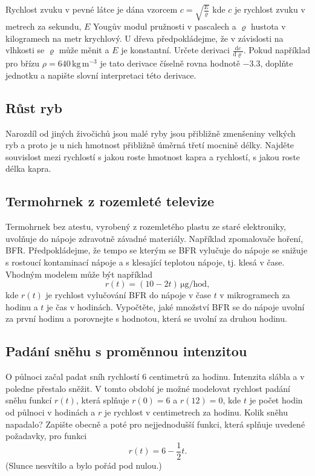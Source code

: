 Rychlost zvuku v pevné látce je dána vzorcem $c=\sqrt{\frac E\varrho}$ kde $c$ je rychlost zvuku v metrech za sekundu, $E$ Yougův modul pružnosti v pascalech a $\varrho$ hustota v kilogramech na metr krychlový. U dřeva předpokládejme, že v závislosti na vlhkosti se $\varrho$ může měnit a $E$ je konstantní. Určete derivaci $\frac{\mathrm dc}{\mathrm d\varrho}$. Pokud například pro břízu $\rho = 640 \,\mathrm{kg}\,\mathrm{m}^{-3}$ je tato derivace číselně rovna hodnotě $-3.3$, doplňte jednotku a napište slovní interpretaci této derivace.

\subsection{Růst ryb}

Narozdíl od jiných živočichů jsou malé ryby jsou přibližně zmenšeniny
    velkých ryb a proto je u nich hmotnost přibližně úměrná třetí mocnině
    délky. Najděte souvislost mezi rychlostí s jakou roste hmotnost kapra a
    rychlostí, s jakou roste délka kapra.



\subsection{Termohrnek z rozemleté televize}    
Termohrnek bez atestu, vyrobený z rozemletého plastu ze staré
elektroniky, uvolňuje do nápoje zdravotně závadné materiály.
Například zpomalovače hoření, BFR. Předpokládejme, že tempo se kterým
se BFR vylučuje do nápoje se snižuje s rostoucí kontaminací nápoje a s
klesající teplotou nápoje, tj. klesá v čase. Vhodným modelem může být
například
    $$r(t)=(10-2t) \,\mathrm{\mu g}/\mathrm{hod},$$ kde $r(t)$ je rychlost vylučování
    BFR do nápoje v čase $t$ v mikrogramech za hodinu a $t$ je čas v hodinách. Vypočtěte, jaké množství
    BFR se do nápoje uvolní za první hodinu a porovnejte s
    hodnotou, která se uvolní za druhou hodinu.


    \subsection{Padání sněhu s proměnnou intenzitou}

    O půlnoci začal padat sníh rychlostí $6$ centimetrů za hodinu. Intenzita
    slábla a v poledne přestalo sněžit. V tomto období je možné modelovat
    rychlost padání sněhu funkcí $r(t)$, která splňuje $r(0)=6$ a
    $r(12)=0$, kde $t$ je počet hodin od půlnoci v
    hodinách a $r$ je rychlost v centimetrech za hodinu. Kolik sněhu napadalo? Zapište obecně a poté pro nejjednodušší funkci, která splňuje uvedené požadavky, pro funkci $$r(t)=6-\frac 12 t.$$
    (Slunce nesvítilo a bylo pořád pod nulou.)


